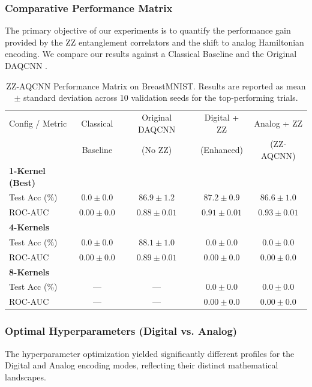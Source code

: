 \documentclass{oqireport}
\begin{document}
\subsubsection{Comparative Performance Matrix}
The primary objective of our experiments is to quantify the performance gain provided by the ZZ entanglement correlators and the shift to analog Hamiltonian encoding. We compare our results against a Classical Baseline and the Original DAQCNN \cite{simen2024digital}.

\begin{table}[htbp]
    \centering
    \caption{ZZ-AQCNN Performance Matrix on BreastMNIST. Results are reported as mean $\pm$ standard deviation across 10 validation seeds for the top-performing trials.}
    \begin{tabular}{l c c c c}
        \toprule
        Config / Metric & Classical & Original DAQCNN & Digital + ZZ & Analog + ZZ \\
                        & Baseline & (No ZZ) & (Enhanced) & (ZZ-AQCNN) \\
        \midrule
        \textbf{1-Kernel (Best)} & & & & \\
        Test Acc (\%) & $0.0 \pm 0.0$ & $86.9 \pm 1.2$ & $87.2 \pm 0.9$ & $86.6 \pm 1.0$ \\
        ROC-AUC       & $0.00 \pm 0.0$ & $0.88 \pm 0.01$ & $0.91 \pm 0.01$ & $0.93 \pm 0.01$ \\
        \midrule
        \textbf{4-Kernels} & & & & \\
        Test Acc (\%) & $0.0 \pm 0.0$ & $88.1 \pm 1.0$ & $0.0 \pm 0.0$ & $0.0 \pm 0.0$ \\
        ROC-AUC       & $0.00 \pm 0.0$ & $0.89 \pm 0.01$ & $0.00 \pm 0.0$ & $0.00 \pm 0.0$ \\
        \midrule
        \textbf{8-Kernels} & & & & \\
        Test Acc (\%) & ---   & ---   & $0.0 \pm 0.0$ & $0.0 \pm 0.0$ \\
        ROC-AUC       & ---   & ---   & $0.00 \pm 0.0$ & $0.00 \pm 0.0$ \\
        \bottomrule
    \end{tabular}
    \label{tab:main_results}
\end{table}

\subsubsection{Optimal Hyperparameters (Digital vs. Analog)}
The hyperparameter optimization yielded significantly different profiles for the Digital and Analog encoding modes, reflecting their distinct mathematical landscapes.
\end{document}
